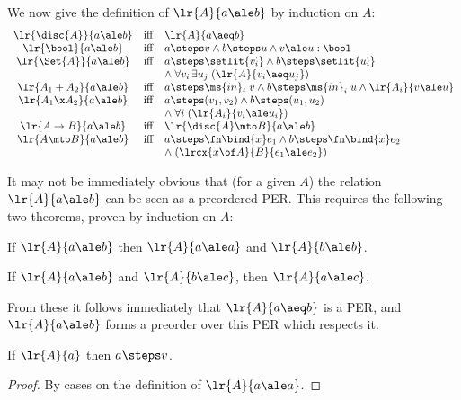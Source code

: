 We now give the definition of $\lr{A}{a \ale b}$ by induction on $A$:
\[\begin{array}{ccl}
  \lr{\disc{A}}{a \ale b} &\tiff& \lr{A}{a \aeq b}\\
  \lr{\bool}{a \ale b} &\tiff&
  a \steps v \land b \steps u \land v \ale u : \bool\\
  \lr{\Set{A}}{a \ale b} &\tiff&
  a \steps \setlit{\vec{v_i}} \land b \steps \setlit{\vec{u_i}}\\
  && \mathrel{\land} \forall v_i\,\exists u_j\; (\lr{A}{v_i \aeq u_j})\\
  \lr{A_1 + A_2}{a \ale b} &\tiff&
  a \steps \ms{in}_i\;v \land b \steps \ms{in}_i\;u \land \lr{A_i}{v \ale u}\\
  \lr{A_1 \x A_2}{a \ale b} &\tiff&
  a \steps (v_1, v_2) \land b \steps (u_1, u_2)\\
  && \mathrel{\land} \forall i\; (\lr{A_i}{v_i \ale u_i})\\
  \lr{A \to B}{a \ale b} &\tiff& \lr{\disc{A} \mto B}{a \ale b}\\
  \lr{A \mto B}{a \ale b} &\tiff&
  a \steps \fn\bind{x} e_1 \land b \steps \fn\bind{x} e_2\\
  && \mathrel{\land} (\lrcx{x\of A}{B}{e_1 \ale e_2})
\end{array}\]

It may not be immediately obvious that (for a given $A$) the relation $\lr{A}{a
  \ale b}$ can be seen as a preordered PER. This requires the following two
theorems, proven by induction on $A$:

\begin{theorem}
  If $\lr{A}{a \ale b}$ then $\lr{A}{a \ale a}$ and $\lr{A}{b \ale b}$.
\end{theorem}

\begin{theorem}[Transitivity]
  If $\lr{A}{a \ale b}$ and $\lr{A}{b \ale c}$, then $\lr{A}{a \ale c}$.
\end{theorem}

From these it follows immediately that $\lr{A}{a \aeq b}$ is a PER, and
$\lr{A}{a \ale b}$ forms a preorder over this PER which respects it.

\begin{theorem}[Termination]
  If $\lr{A}{a}$ then $a \steps v$.
\end{theorem}
\begin{proof}
  By cases on the definition of $\lr{A}{a \ale a}$.
\end{proof}

